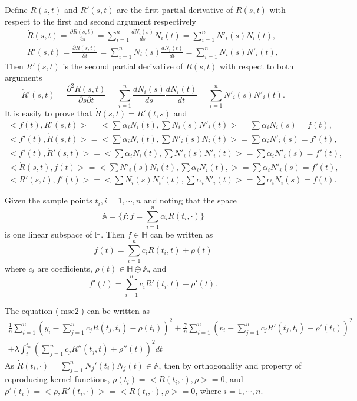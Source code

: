 Define $\dot{R}(s,t)$ and $R'(s,t)$ are the first partial derivative of $R(s,t)$ with respect to the first  and second argument respectively
\begin{align} \label{dotr}
\dot{R}(s,t)=\frac{\partial R(s,t)}{\partial s}=\sum_{i=1}^{n} \frac{dN_i(s)}{ds}N_i(t)=\sum_{i=1}^{n} N'_i(s)N_i(t),\\
\label{dotr2}
 R'(s,t)=\frac{\partial R(s,t)}{\partial t}=\sum_{i=1}^{n} N_i(s)\frac{dN_i(t)}{dt}=\sum_{i=1}^{n} N_i(s)N'_i(t),
\end{align}
Then $\dot{R}'(s,t)$ is the second partial derivative of $R(s,t)$ with respect to both arguments
\begin{equation*}
\dot{R}'(s,t)=\frac{\partial^2 R(s,t)}{\partial s \partial t}=\sum_{i=1}^{n} \frac{dN_i(s)}{ds}\frac{dN_i(t)}{dt}=\sum_{i=1}^{n} N'_i(s)N'_i(t).
\end{equation*}
It is easily to prove that $\dot{R}(s,t)=R'(t,s)$ and
\begin{align*}
<f(t), R'(s,t)> = <\sum \alpha_i N_i(t), \sum N_i(s)N'_i(t)> =   \sum \alpha_i N_i(s) =f(t),\\
<f'(t), \dot{R}(s,t)> = <\sum \alpha_i N_i(t), \sum N'_i(s)N_i(t)> =   \sum \alpha_i N'_i(s) =f'(t),\\
<f'(t), \dot{R}'(s,t)> = <\sum \alpha_i N_i(t), \sum N'_i(s)N'_i(t)> =   \sum \alpha_i N'_i(s) =f'(t),\\
<\dot{R}(s,t),f(t)> = <\sum N'_i(s)N_i(t), \sum \alpha_i N_i(t), > =   \sum \alpha_i N'_i(s) =f'(t),\\
<R'(s,t),f'(t)> = <\sum N_i(s)N_i'(t), \sum \alpha_i N'_i(t)> =   \sum \alpha_i N_i(s) =f(t).
\end{align*}

Given the sample points $t_i, i=1, \cdots, n$ and noting that the space
\begin{equation*}
\mathbb{A}=\{f: f=\sum_{i=1}^{n}\alpha_iR(t_i,\cdot) \} 
\end{equation*}
is one linear subspace of $\mathbb{H}$. Then $f \in \mathbb{H}$ can be written as
\begin{equation}\label{etaeq}
f(t)=\sum_{i=1}^{n}c_iR(t_i,t)+\rho(t)
\end{equation}
where $c_i$ are coefficients, $\rho(t) \in \mathbb{H} \ominus \mathbb{A} $, and 
\begin{equation}\label{etaeq2}
f'(t)=\sum_{i=1}^{n}c_iR'(t_i,t)+\rho'(t).
\end{equation}

The equation (\ref{mse2}) can be written as
\begin{align*}
\frac{1}{n}\sum_{i=1}^n (y_i -\sum_{j=1}^{n}c_jR(t_j,t_i) -\rho(t_i))^2+
\frac{\gamma}{n}\sum_{i=1}^n (v_i -\sum_{j=1}^{n}c_jR'(t_j,t_i) -\rho'(t_i))^2 \\
+\lambda \int_{t_1}^{t_n} (\sum_{j=1}^{n}c_jR''(t_j,t)+\rho''(t))^2dt
\end{align*}
As $\dot{R}(t_i,\cdot) = \sum_{j=1}^{n}N_j'(t_i)N_j(t) \in \mathbb{A}$, then by orthogonality and property of reproducing kernel functions, $\rho(t_i)=<R(t_i,\cdot),\rho>=0$, %
and $\rho'(t_i)=<\rho,R'(t_i,\cdot)>=<\dot{R}(t_i,\cdot),\rho>=0$, where $i=1,\cdots,n$. 

